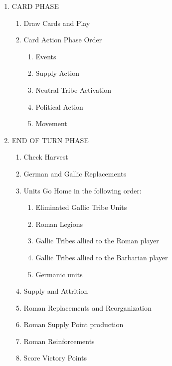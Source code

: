\begin{samepage}
\renewcommand{\labelenumii}{\Alph{enumii}.}
\begin{enumerate}
    \item CARD PHASE
    \begin{enumerate}
        \item Draw Cards and Play
        \item Card Action Phase Order
        \begin{enumerate}
            \item Events
            \item Supply Action
            \item Neutral Tribe Activation
            \item Political Action
            \item Movement
        \end{enumerate}
    \end{enumerate}
    \item END OF TURN PHASE
    \begin{enumerate}
        \item Check Harvest
        \item German and Gallic Replacements
        \item Units Go Home in the following order:
        \begin{enumerate}
            \item Eliminated Gallic Tribe Units
            \item Roman Legions
            \item Gallic Tribes allied to the Roman player
            \item Gallic Tribes allied to the Barbarian player
            \item Germanic units
        \end{enumerate}
        \item Supply and Attrition
        \item Roman Replacements and Reorganization
        \item Roman Supply Point production
        \item Roman Reinforcements
        \item Score Victory Points
    \end{enumerate}
\end{enumerate}
\end{samepage}